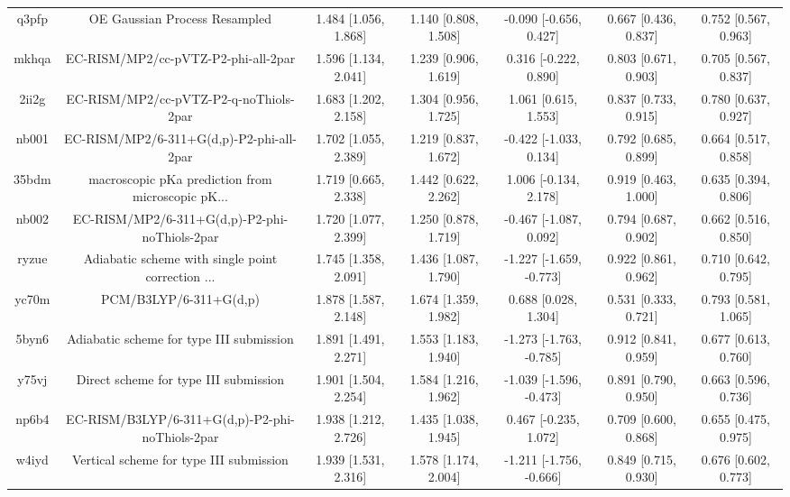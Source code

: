 \documentclass{article}
\begin{document}
\begin{center}
\begin{longtable}{|ccccccc|}
 q3pfp &                      OE Gaussian Process Resampled &  1.484 [1.056, 1.868] &  1.140 [0.808, 1.508] &   -0.090 [-0.656, 0.427] &  0.667 [0.436, 0.837] &   0.752 [0.567, 0.963] \\
 mkhqa &                EC-RISM/MP2/cc-pVTZ-P2-phi-all-2par &  1.596 [1.134, 2.041] &  1.239 [0.906, 1.619] &    0.316 [-0.222, 0.890] &  0.803 [0.671, 0.903] &   0.705 [0.567, 0.837] \\
 2ii2g &             EC-RISM/MP2/cc-pVTZ-P2-q-noThiols-2par &  1.683 [1.202, 2.158] &  1.304 [0.956, 1.725] &     1.061 [0.615, 1.553] &  0.837 [0.733, 0.915] &   0.780 [0.637, 0.927] \\
 nb001 &           EC-RISM/MP2/6-311+G(d,p)-P2-phi-all-2par &  1.702 [1.055, 2.389] &  1.219 [0.837, 1.672] &   -0.422 [-1.033, 0.134] &  0.792 [0.685, 0.899] &   0.664 [0.517, 0.858] \\
 35bdm &  macroscopic pKa prediction from microscopic pK... &  1.719 [0.665, 2.338] &  1.442 [0.622, 2.262] &    1.006 [-0.134, 2.178] &  0.919 [0.463, 1.000] &   0.635 [0.394, 0.806] \\
 nb002 &      EC-RISM/MP2/6-311+G(d,p)-P2-phi-noThiols-2par &  1.720 [1.077, 2.399] &  1.250 [0.878, 1.719] &   -0.467 [-1.087, 0.092] &  0.794 [0.687, 0.902] &   0.662 [0.516, 0.850] \\
 ryzue &  Adiabatic scheme with single point correction ... &  1.745 [1.358, 2.091] &  1.436 [1.087, 1.790] &  -1.227 [-1.659, -0.773] &  0.922 [0.861, 0.962] &   0.710 [0.642, 0.795] \\
 yc70m &                             PCM/B3LYP/6-311+G(d,p) &  1.878 [1.587, 2.148] &  1.674 [1.359, 1.982] &     0.688 [0.028, 1.304] &  0.531 [0.333, 0.721] &   0.793 [0.581, 1.065] \\
 5byn6 &           Adiabatic scheme for type III submission &  1.891 [1.491, 2.271] &  1.553 [1.183, 1.940] &  -1.273 [-1.763, -0.785] &  0.912 [0.841, 0.959] &   0.677 [0.613, 0.760] \\
 y75vj &              Direct scheme for type III submission &  1.901 [1.504, 2.254] &  1.584 [1.216, 1.962] &  -1.039 [-1.596, -0.473] &  0.891 [0.790, 0.950] &   0.663 [0.596, 0.736] \\
 np6b4 &    EC-RISM/B3LYP/6-311+G(d,p)-P2-phi-noThiols-2par &  1.938 [1.212, 2.726] &  1.435 [1.038, 1.945] &    0.467 [-0.235, 1.072] &  0.709 [0.600, 0.868] &   0.655 [0.475, 0.975] \\
 w4iyd &            Vertical scheme for type III submission &  1.939 [1.531, 2.316] &  1.578 [1.174, 2.004] &  -1.211 [-1.756, -0.666] &  0.849 [0.715, 0.930] &   0.676 [0.602, 0.773] \\

\end{longtable}
\end{center}
\end{document}
